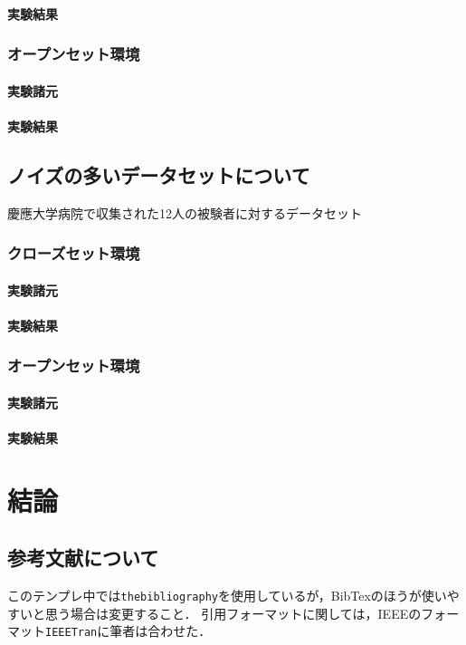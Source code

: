 \subsubsection{実験結果}
\subsection{オープンセット環境}
\subsubsection{実験諸元}
\subsubsection{実験結果}


\section{ノイズの多いデータセットについて}
慶應大学病院で収集された12人の被験者に対するデータセット
\subsection{クローズセット環境}
\subsubsection{実験諸元}
\subsubsection{実験結果}
\subsection{オープンセット環境}
\subsubsection{実験諸元}
\subsubsection{実験結果}


\chapter{結論}

\section{参考文献について}
このテンプレ中では{\tt thebibliography}を使用しているが，BibTexのほうが使いやすいと思う場合は変更すること．
引用フォーマットに関しては，IEEEのフォーマット{\tt IEEETran}に筆者は合わせた．

